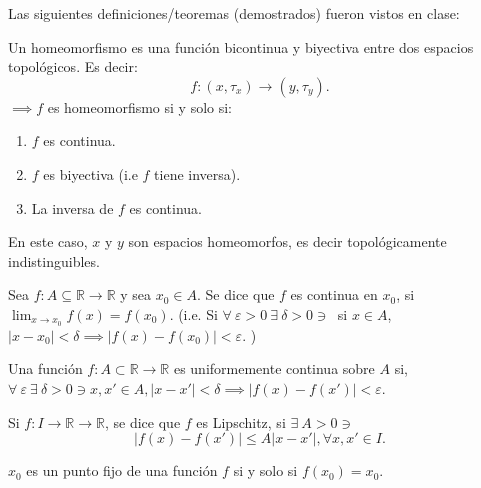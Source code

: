


Las siguientes definiciones/teoremas (demostrados) fueron vistos en clase: 

\begin{tcolorbox}[colback=blue!15,colframe=blue!1!blue,title=Homeomorfismo]
	Un homeomorfismo es una función bicontinua y biyectiva entre dos espacios topológicos. Es decir:
	$$f:(x,\tau_{x})\to (y, \tau_{y}).$$
	$\implies f $ es homeomorfismo si y solo si: 
	\begin{enumerate}
		\item $f$ es continua. 
		\item $f$ es biyectiva (i.e $f$ tiene inversa).
		\item La inversa de $f$ es continua.
	\end{enumerate} 
En este caso, $x$ y $y$ son espacios homeomorfos, es decir topológicamente indistinguibles. 
\end{tcolorbox}

\begin{tcolorbox}[colback=blue!15,colframe=blue!1!blue,title=Definición de continuidad]
Sea $f:A\subseteq \mathbb{R}\to\mathbb{R}$  y sea 
$x_0 \in A$. Se dice que $f$ es continua en $x_0$, si $\lim_{x\to x_0} f(x)=f(x_0)$. (i.e. Si $\forall \ \varepsilon>0 \ \exists \ \delta >0 \ni \ $ si $x\in A$, $|x-x_0|<\delta \implies |f(x)-f(x_0)|<\varepsilon$.  )
\end{tcolorbox}


\begin{tcolorbox}[colback=blue!15,colframe=blue!1!blue,title=Definición de continuidad uniforme]
	Una función $f:A\subset \mathbb{R}\to \mathbb{R}$ es uniformemente continua sobre $A$ si, $\forall \ \varepsilon \ \exists \ \delta >0 \ni  x, x'\in A, |x-x'|<\delta \implies |f(x)-f(x')| <\varepsilon$. 
\end{tcolorbox}

\begin{tcolorbox}[colback=blue!15,colframe=blue!1!blue,title=Definición de Lipschitz]
	
	Si $f:I\to \mathbb{R}\to \mathbb{R}$, se dice que $f$ es Lipschitz, si $\exists \ A>0 \ni $
	$$|f(x)-f(x')|\leq A|x-x'|, \forall x,x' \in I.$$
\end{tcolorbox}


\begin{tcolorbox}[colback=blue!15,colframe=blue!1!blue,title=Definición de punto fijo]
$x_0$ es un punto fijo de una función $f$ si y solo si $f(x_0)=x_0$.
\end{tcolorbox}

